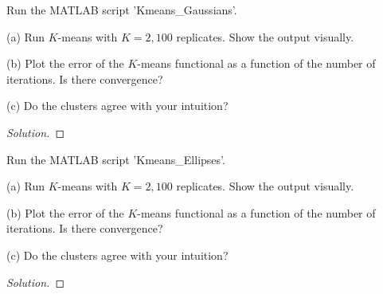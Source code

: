 \documentclass[10pt]{article}
\newenvironment{problem}[2][]{\begin{trivlist}
\item[\hskip \labelsep {\bfseries #1}\hskip \labelsep {\bfseries #2.}]}{\end{trivlist}}
\begin{document}
\begin{problem}{Question 5}
 
Run the MATLAB script 'Kmeans\_Gaussians'.

(a) Run $K$-means with $K=2, 100$ replicates. Show the output visually.

(b) Plot the error of the $K$-means functional as a function of the number of iterations. Is there convergence?

(c) Do the clusters agree with your intuition?

\end{problem}

\begin{proof}[Solution]


\end{proof}

\begin{problem}{Question 6}
 
Run the MATLAB script 'Kmeans\_Ellipses'.

(a) Run $K$-means with $K=2, 100$ replicates. Show the output visually.

(b) Plot the error of the $K$-means functional as a function of the number of iterations. Is there convergence?

(c) Do the clusters agree with your intuition?

\end{problem}

\begin{proof}[Solution]


\end{proof}
\end{document}
